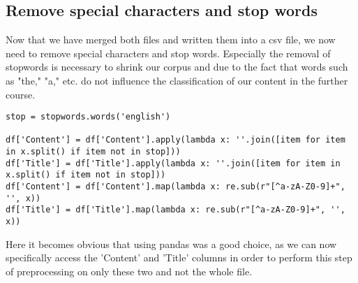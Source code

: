 \documentclass[11pt,titlepage,oneside,openany]{book}
\begin{document}
\subsection{Remove special characters and stop words}
Now that we have merged both files and written them into a csv file, we now need to remove special characters and stop words. Especially the removal of stopwords is necessary to shrink our corpus and due to the fact that words such as "the," "a," etc. do not influence the classification of our content in the further course.
\begin{lstlisting}[frame=single]
stop = stopwords.words('english')

df['Content'] = df['Content'].apply(lambda x: ''.join([item for item in x.split() if item not in stop]))
df['Title'] = df['Title'].apply(lambda x: ''.join([item for item in x.split() if item not in stop]))
df['Content'] = df['Content'].map(lambda x: re.sub(r"[^a-zA-Z0-9]+", '', x))
df['Title'] = df['Title'].map(lambda x: re.sub(r"[^a-zA-Z0-9]+", '', x))
\end{lstlisting}
\noindent Here it becomes obvious that using pandas was a good choice, as we can now specifically access the 'Content' and 'Title' columns in order to perform this step of preprocessing on only these two and not the whole file.
\end{document}
